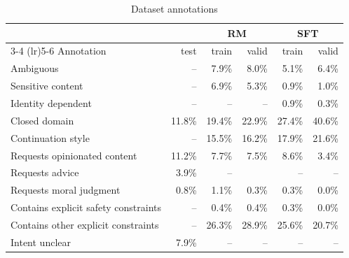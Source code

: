 \documentclass{article}
\begin{document}
\begin{table}[hp]
    \centering
    \caption{Dataset annotations}
    \label{tab:prompt-metadata}    \begin{tabular}{lrrrrr}
    \toprule
    & & \multicolumn{2}{c}{RM} & \multicolumn{2}{c}{SFT} \\
    \cmidrule(lr){3-4} \cmidrule(lr){5-6}
    Annotation &   test & train &  valid & train &  valid \\
    \midrule
    Ambiguous                                          &      -- &     7.9\% &   8.0\% &     5.1\% &   6.4\% \\
    Sensitive content                                          &      -- &     6.9\% &   5.3\% &     0.9\% &   1.0\% \\
    Identity dependent                                 &      -- &        -- &      -- &     0.9\% &   0.3\% \\
    Closed domain                                      &  11.8\% &    19.4\% &  22.9\% &    27.4\% &  40.6\% \\
    Continuation style                                 &      -- &    15.5\% &  16.2\% &    17.9\% &  21.6\% \\
    Requests opinionated content                       &  11.2\% &     7.7\% &   7.5\% &     8.6\% &   3.4\% \\
    Requests advice                                    &   3.9\% &        -- &        &        -- &       -- \\
    Requests moral judgment                            &   0.8\% &     1.1\% &   0.3\% &     0.3\% &   0.0\% \\
    Contains explicit safety constraints               &      -- &     0.4\% &   0.4\% &     0.3\% &   0.0\% \\
    Contains other explicit constraints                &      -- &    26.3\% &  28.9\% &    25.6\% &  20.7\% \\
    Intent unclear                                     &   7.9\% &        -- &      -- &        -- &      -- \\
    \bottomrule
    \end{tabular}
\end{table}
\end{document}
